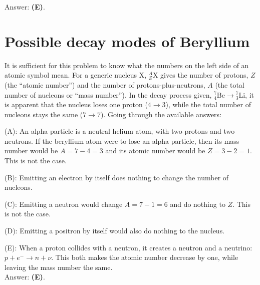 \documentclass[11pt]{paper}
\newcommand{\answer}[1]{Answer: \textbf{(#1)}.}
\begin{document}
\answer{E}

\section{Possible decay modes of Beryllium}
It is sufficient for this problem to know what the numbers on the left side of an atomic symbol mean.  For a generic nucleus $\text{X}$, ${}^A_Z \text{X}$ gives the number of protons, $Z$ (the ``atomic number'') and the number of protons-plus-neutrons, $A$ (the total number of nucleons or ``mass number'').  In the decay process given, ${}^7_4\text{Be}\rightarrow{}^7_3\text{Li}$, it is apparent that the nucleus loses one proton ($4\rightarrow3$), while the total number of nucleons stays the same ($7\rightarrow7$).  Going through the available answers:

(A): An alpha particle is a neutral helium atom, with two protons and two neutrons.  If the beryllium atom were to lose an alpha particle, then its mass number would be $A = 7-4=3$ and its atomic number would be $Z=3-2=1$.  This is not the case.

(B): Emitting an electron by itself does nothing to change the number of nucleons.

(C): Emitting a neutron would change $A = 7-1=6$ and do nothing to $Z$.  This is not the case.

(D): Emitting a positron by itself would also do nothing to the nucleus.

(E): When a proton collides with a neutron, it creates a neutron and a neutrino: $p + e^- \rightarrow n + \nu$.  This both makes the atomic number decrease by one, while leaving the mass number the same.\\

\answer{E} 
\end{document}
